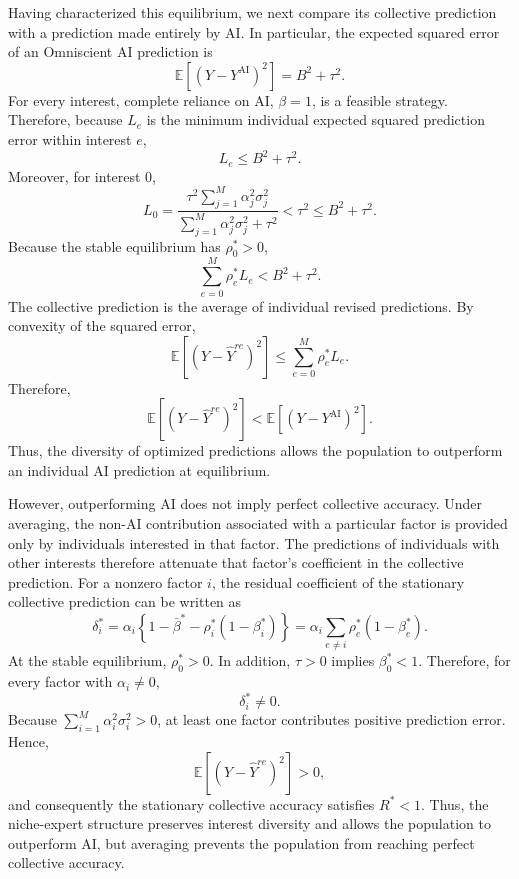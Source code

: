 \documentclass[12pt]{article}
\begin{document}
Having characterized this equilibrium, we next compare its collective prediction with a prediction made entirely by AI. 
In particular, the expected squared error of an Omniscient AI prediction is
\begin{equation}
\mathbb{E}\left[(Y-Y^{\mathrm{AI}})^2\right] = B^2+\tau^2.
\end{equation}
For every interest, complete reliance on AI, $\beta=1$, is a feasible strategy.
Therefore, because $L_e$ is the minimum individual expected squared prediction error within interest $e$,
\begin{equation}
L_e\leq B^2+\tau^2.
\end{equation}
Moreover, for interest 0,
\begin{equation}
L_0 = \frac{\tau^2\sum_{j=1}^{M}\alpha_j^2\sigma_j^2}{\sum_{j=1}^{M}\alpha_j^2\sigma_j^2+\tau^2}
< \tau^2 \leq B^2+\tau^2.
\end{equation}
Because the stable equilibrium has $\rho_0^*>0$,
\begin{equation}
\sum_{e=0}^{M}\rho_e^*L_e < B^2+\tau^2.
\end{equation}
The collective prediction is the average of individual revised predictions.
By convexity of the squared error,
\begin{equation}
\mathbb{E}\left[(Y-\hat{Y}^{re})^2\right] \leq \sum_{e=0}^{M}\rho_e^*L_e.
\end{equation}
Therefore,
\begin{equation}
\mathbb{E}\left[(Y-\hat{Y}^{re})^2\right] < \mathbb{E}\left[(Y-Y^{\mathrm{AI}})^2\right].
\end{equation}
Thus, the diversity of optimized predictions allows the population to outperform an individual AI prediction at equilibrium.

However, outperforming AI does not imply perfect collective accuracy. 
Under averaging, the non-AI contribution associated with a particular factor is provided only by individuals interested in that factor. 
The predictions of individuals with other interests therefore attenuate that factor's coefficient in the collective prediction. 
For a nonzero factor $i$, the residual coefficient of the stationary collective prediction can be written as
\begin{equation}
\delta_i^* = \alpha_i\left\{1-\bar{\beta}^*-\rho_i^*(1-\beta_i^*)\right\} = \alpha_i\sum_{e\neq i}\rho_e^*(1-\beta_e^*).
\end{equation}
At the stable equilibrium, $\rho_0^*>0$.
In addition, $\tau>0$ implies $\beta_0^*<1$.
Therefore, for every factor with $\alpha_i\neq0$,
\begin{equation}
\delta_i^*\neq0.
\end{equation}
Because $\sum_{i=1}^{M}\alpha_i^2\sigma_i^2>0$, at least one factor contributes positive prediction error.
Hence,
\begin{equation}
\mathbb{E}\left[(Y-\hat{Y}^{re})^2\right]>0,
\end{equation}
and consequently the stationary collective accuracy satisfies $R^*<1$.
Thus, the niche-expert structure preserves interest diversity and allows the population to outperform AI, but averaging prevents the population from reaching perfect collective accuracy.
\end{document}
